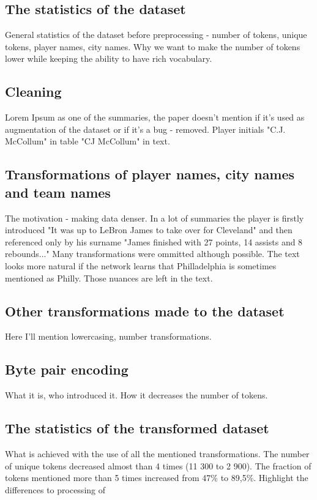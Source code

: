 \subsection{The statistics of the dataset}
General statistics of the dataset before preprocessing - number of tokens, unique tokens, player names, city names. Why we want to make the number of tokens lower while keeping the ability to have rich vocabulary.

\subsection{Cleaning}
Lorem Ipsum as one of the summaries, the paper doesn't mention if it's used as augmentation of the dataset or if it's a bug - removed. Player initials "C.J. McCollum" in table "CJ McCollum" in text. 

\subsection{Transformations of player names, city names and \linebreak[4] team names}
The motivation - making data denser. In a lot of summaries the player is firstly introduced "It was up to LeBron James to take over for Cleveland" and then referenced only by his surname "James finished with 27 points, 14 assists and 8 rebounds..." Many transformations were ommitted although possible. The text looks more natural if the network learns that Philladelphia is sometimes mentioned as Philly. Those nuances are left in the text.

\subsection{Other transformations made to the dataset}
Here I'll mention lowercasing, number transformations.

\subsection{Byte pair encoding}
What it is, who introduced it. How it decreases the number of tokens.

\subsection{The statistics of the transformed dataset}
What is achieved with the use of all the mentioned transformations. The number of unique tokens decreased almost than 4 times (11 300 to 2 900). The fraction of tokens mentioned more than 5 times increased from 47\% to 89,5\%. Highlight the differences to processing of  